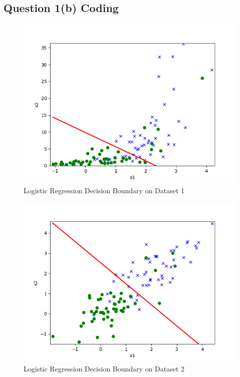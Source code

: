 \documentclass[11pt]{article}
\begin{document}
	\newpage
	\subsection{Question 1(b) Coding}
	\begin{figure}[h]
		\centering
		\includegraphics[width=0.6\linewidth]{src/linearclass/logreg_pred_1.png}
		\caption{Logistic Regression Decision Boundary on Dataset 1}
	\end{figure}
	
	\begin{figure}[h]
		\centering
		\includegraphics[width=0.6\linewidth]{src/linearclass/logreg_pred_2.png}
		\caption{Logistic Regression Decision Boundary on Dataset 2}
	\end{figure}
	
	
	\newpage
\end{document}
